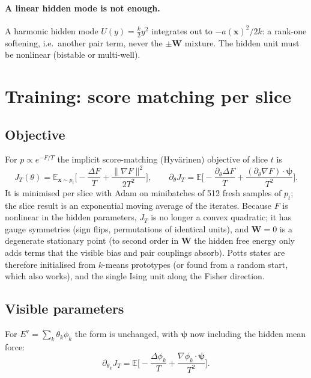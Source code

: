 \documentclass[11pt,a4paper]{article}
\newcommand{\vx}{\bm{x}}
\newcommand{\E}{\mathbb{E}}
\newcommand{\Ev}{E^{\mathrm{v}}}
\newcommand{\grad}{\nabla}
\begin{document}
\paragraph{A linear hidden mode is not enough.} A harmonic hidden mode $U(y)=\tfrac{k}{2}y^2$ integrates out to
$-a(\vx)^2/2k$: a rank-one softening, i.e.\ another pair term, never the $\pm\bm W$ mixture. The hidden unit must be
nonlinear (bistable or multi-well).

\section{Training: score matching per slice}\label{sec:training}

\subsection{Objective}
For $p\propto e^{-F/T}$ the implicit score-matching (Hyv\"arinen) objective of slice $t$ is
\begin{equation}
  J_T(\theta)=\E_{\vx\sim p_t}\Big[-\frac{\Delta F}{T}+\frac{\|\grad F\|^2}{2T^2}\Big],\qquad
  \partial_\theta J_T=\E\Big[-\frac{\partial_\theta\Delta F}{T}+\frac{(\partial_\theta\grad F)\cdot\bm\psi}{T^2}\Big].
\end{equation}
It is minimised per slice with Adam on minibatches of 512 fresh samples of $p_t$; the slice result is an
exponential moving average of the iterates. Because $F$ is nonlinear in the hidden parameters, $J_T$ is no longer
a convex quadratic; it has gauge symmetries (sign flips, permutations of identical units), and $\bm W=0$ is a
degenerate stationary point (to second order in $\bm W$ the hidden free energy only adds terms that the visible
bias and pair couplings absorb). Potts states are therefore initialised from $k$-means prototypes (or found from a
random start, which also works), and the single Ising unit along the Fisher direction.

\subsection{Visible parameters}
For $\Ev=\sum_k\theta_k\phi_k$ the form is unchanged, with $\bm\psi$ now including the hidden mean force:
\begin{equation}
  \partial_{\theta_k}J_T=\E\Big[-\frac{\Delta\phi_k}{T}+\frac{\grad\phi_k\cdot\bm\psi}{T^2}\Big].
\end{equation}
\end{document}
